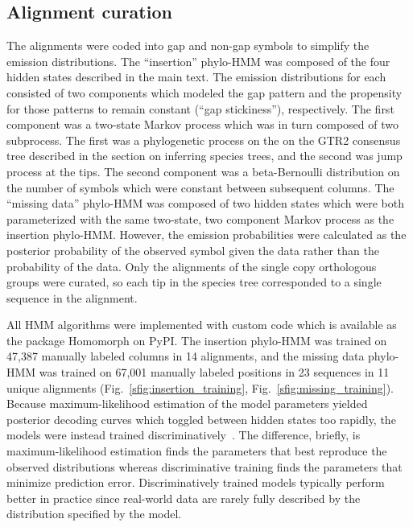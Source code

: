 \subsection{Alignment curation}
The alignments were coded into gap and non-gap symbols to simplify the emission distributions. The ``insertion'' phylo-HMM was composed of the four hidden states described in the main text. The emission distributions for each consisted of two components which modeled the gap pattern and the propensity for those patterns to remain constant (``gap stickiness''), respectively. The first component was a two-state Markov process which was in turn composed of two subprocess. The first was a phylogenetic process on the on the GTR2 consensus tree described in the section on inferring species trees, and the second was jump process at the tips. The second component was a beta-Bernoulli distribution on the number of symbols which were constant between subsequent columns. The ``missing data'' phylo-HMM was composed of two hidden states which were both parameterized with the same two-state, two component Markov process as the insertion phylo-HMM. However, the emission probabilities were calculated as the posterior probability of the observed symbol given the data rather than the probability of the data. Only the alignments of the single copy orthologous groups were curated, so each tip in the species tree corresponded to a single sequence in the alignment.

All HMM algorithms were implemented with custom code which is available as the package Homomorph on PyPI. The insertion phylo-HMM was trained on 47,387 manually labeled columns in 14 alignments, and the missing data phylo-HMM was trained on 67,001 manually labeled positions in 23 sequences in 11 unique alignments (Fig.~\ref{sfig:insertion_training}, Fig.~\ref{sfig:missing_training}). Because maximum-likelihood estimation of the model parameters yielded posterior decoding curves which toggled between hidden states too rapidly, the models were instead trained discriminatively~\cite{Krogh1999}. The difference, briefly, is maximum-likelihood estimation finds the parameters that best reproduce the observed distributions whereas discriminative training finds the parameters that minimize prediction error. Discriminatively trained models typically perform better in practice since real-world data are rarely fully described by the distribution specified by the model.

